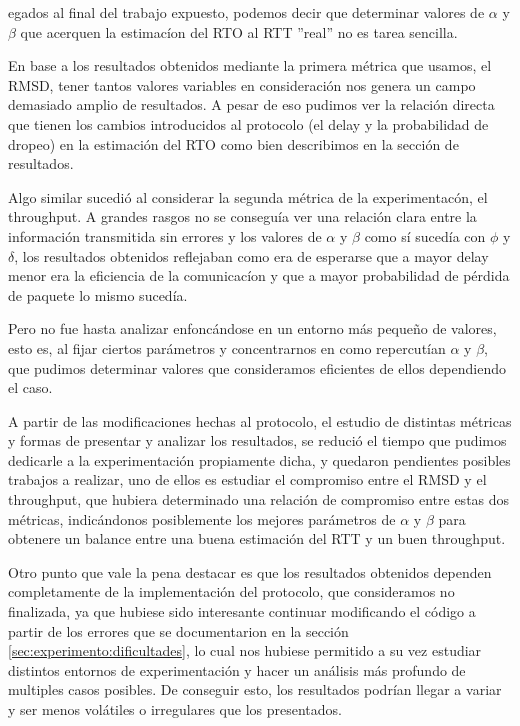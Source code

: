 egados al final del trabajo expuesto, podemos decir que
determinar valores de $\alpha$ y $\beta$ que acerquen la estimac\'ion del RTO al
RTT ''real'' no es tarea sencilla.

\par En base a los resultados obtenidos mediante la primera m\'etrica que
usamos, el RMSD, tener tantos valores variables en consideraci\'on nos genera un
campo demasiado amplio de resultados.  A pesar de eso pudimos ver la relaci\'on
directa que tienen los cambios introducidos al protocolo (el delay y la
probabilidad de dropeo) en la estimaci\'on del RTO como bien describimos en la
secci\'on de resultados.

\par Algo similar sucedi\'o al considerar la segunda m\'etrica de la
experimentac\'on, el throughput.  A grandes rasgos no se consegu\'ia ver una
relaci\'on clara entre la informaci\'on transmitida sin errores y los valores de
$\alpha$ y $\beta$ como s\'i suced\'ia con $\phi$ y $\delta$, los resultados
obtenidos reflejaban como era de esperarse que a mayor delay menor era la
eficiencia de la comunicac\'ion y que a mayor probabilidad de p\'erdida de
paquete lo mismo suced\'ia.


\par Pero no fue hasta analizar enfonc\'andose en un entorno m\'as peque\~no de
valores, esto es, al fijar ciertos par\'ametros y concentrarnos en como
repercut\'ian $\alpha$ y $\beta$, que pudimos determinar valores que
consideramos eficientes de ellos dependiendo el caso.

\par A partir de las modificaciones hechas al protocolo, el estudio de distintas
m\'etricas y formas de presentar y analizar los resultados, se reduci\'o el
tiempo que pudimos dedicarle a la experimentaci\'on propiamente dicha, y
quedaron pendientes posibles trabajos a realizar, uno de ellos es estudiar el
compromiso entre el RMSD y el throughput, que hubiera determinado una relaci\'on
de compromiso entre estas dos m\'etricas, indic\'andonos posiblemente los
mejores par\'ametros de $\alpha$ y $\beta$ para obtenere un balance entre una
buena estimaci\'on del RTT y un buen throughput.

\par Otro punto que vale la pena destacar es que los resultados obtenidos
dependen completamente de la implementaci\'on del protocolo, que consideramos no
finalizada, ya que hubiese sido interesante continuar modificando el c\'odigo a
partir de los errores que se documentarion en la secci\'on
\ref{sec:experimento:dificultades}, lo cual nos hubiese permitido a su vez
estudiar distintos entornos de experimentaci\'on y hacer un an\'alisis m\'as
profundo de multiples casos posibles. De conseguir esto, los resultados
podr\'ian llegar a variar y ser menos vol\'atiles o irregulares que los
presentados.

